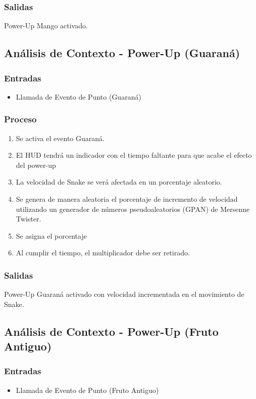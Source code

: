 \documentclass[letterpaper]{scrreprt}
\begin{document}
\subsubsection{Salidas}
Power-Up Mango activado.

\subsection{Análisis de Contexto - Power-Up (Guaraná)}
\subsubsection{Entradas}
\begin{itemize}
	\item Llamada de Evento de Punto (Guaraná)
\end{itemize}
\subsubsection{Proceso}
\begin{enumerate}
	\item Se activa el evento Guaraná.
	\item El HUD tendrá un indicador con el tiempo faltante para que acabe el efecto del power-up
	\item La velocidad de Snake se verá afectada en un porcentaje aleatorio.
	\item Se genera de manera aleatoria el porcentaje de incremento de velocidad utilizando un generador de números pseudoaleatorios (GPAN) de Mersenne Twister.
	\item Se asigna el porcentaje
	\item Al cumplir el tiempo, el multiplicador debe ser retirado.
\end{enumerate}
\subsubsection{Salidas}
Power-Up Guaraná activado con velocidad incrementada en el movimiento de Snake.

\subsection{Análisis de Contexto - Power-Up (Fruto Antiguo)}
\subsubsection{Entradas}
\begin{itemize}
	\item Llamada de Evento de Punto (Fruto Antiguo)
\end{itemize}
\end{document}
